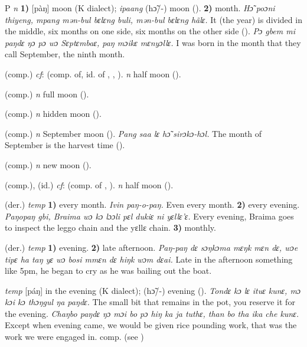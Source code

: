 \begin{letter}{P}
 \textit{n} \textbf{1)} [pàŋ] moon (K dialect); \textit{ipaang} (hɔ̃/-) moon (\citealt{Pichl1967}). \textbf{2)} month. \textit{Hɔ̃ poɔni thiyeng, mpang mən-bul bɛlɛng buli, mən-bul bɛlɛng hãlɛ.} It (the year) is divided in the middle, six months on one side, six months on the other side (\citealt{Pichl1967}). \textit{Pɔ gbem mi paŋdɛ ŋɔ pɔ wɔ Sɛptɛmbaɛ, paŋ mɔikɛ mɛnyɔllɛ.} I was born in the month that they call September, the ninth month.

 (comp.) \textit{cf}:  (comp. of, id. of , , ). \textit{n} half moon (\citealt{Pichl1967}).

 (comp.) \textit{n} full moon (\citealt{Pichl1967}).

 (comp.) \textit{n} hidden moon (\citealt{Pichl1967}).

 (comp.) \textit{n} September moon (\citealt{Pichl1967}). \textit{Pang saa lɛ hɔ̃ sirɔkɔ-hɔl.} The month of September is the harvest time (\citealt{Pichl1967}). 

 (comp.) \textit{n} new moon (\citealt{Pichl1967}).

 (comp.), (id.) \textit{cf}:  (comp. of , ). \textit{n} half moon (\citealt{Pichl1967}).

 (der.) \textit{temp} \textbf{1)} every month. \textit{Ivin paŋ-o-paŋ.} Even every month. \textbf{2)} every evening. \textit{Paŋopaŋ gbi, Braima wɔ kɔ lɔɔli pɛl dukiɛ ni yɛllɛ'ɛ.} Every evening, Braima goes to inspect the leggo chain and the yɛllɛ chain. \textbf{3)} monthly.

 (der.) \textit{temp} \textbf{1)} evening. \textbf{2)} late afternoon. \textit{Paŋ-paŋ dɛ sɔŋkɔma mɛŋk mɛn dɛ, wɔe tipɛ ha taŋ yɛ wɔ bosi mmɛn dɛ hiŋk wɔm dɛai.} Late in the afternoon something like 5pm, he began to cry as he was bailing out the boat.

\textit{temp} [páŋ] in the evening (K dialect); (hɔ̃/-) evening (\citealt{Pichl1967}). \textit{Tondɛ kɔ lɛ ituɛ kunɛ, mɔ kɔi kɔ thɔŋgul ŋa paŋdɛ.} The small bit that remains in the pot, you reserve it for the evening. \textit{Chaŋbo paŋdɛ ŋɔ mɔi bo pɔ hiŋ ka ja tuthɛ, than bo tha ika che kunɛ.} Except when evening came, we would be given rice pounding work, that was the work we were engaged in. comp.  (see ) 


\end{letter}
